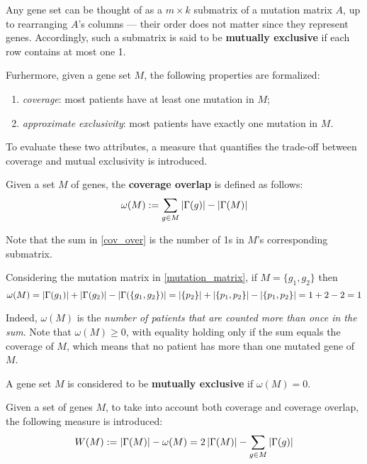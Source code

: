 Any gene set can be thought of as a $m \times k$ submatrix of a mutation matrix $A$, up to rearranging $A$'s columns --- their order does not matter since they represent genes. Accordingly, such a submatrix is said to be \textbf{mutually exclusive} if each row contains at most one 1.

Furhermore, given a gene set $M$, the following properties are formalized:

\begin{enumerate}[label=\roman*), font=\itshape]
    \item \textit{coverage}: most patients have at least one mutation in $M$;
    \item \textit{approximate exclusivity}: most patients have exactly one mutation in $M$.
\end{enumerate}

To evaluate these two attributes, a measure that quantifies the trade-off between coverage and mutual exclusivity is introduced.

\begin{definition} \label{cov_over}
    Given a set $M$ of genes, the \textbf{coverage overlap} is defined as follows: $$\omega(M) := \sum_{g \in M}{\left|\Gamma(g)\right|} - \left|\Gamma(M)\right|$$
\end{definition}

Note that the sum in \cref{cov_over} is the number of 1s in $M$'s corresponding submatrix.

\begin{example}
    Considering the mutation matrix in \cref{mutation_matrix}, if $M=\{g_1, g_2\}$ then $$\omega(M)=\left|\Gamma(g_1)\right| + \left|\Gamma(g_2)\right| - \left|\Gamma(\{g_1, g_2\})\right| = \left|\{p_2\}\right| + \left|\{p_1, p_2\}\right| - \left|\{p_1, p_2\}\right| = 1 + 2 - 2 = 1$$
\end{example}

Indeed, $\omega(M)$ is the \textit{number of patients that are counted more than once in the sum}. Note that $\omega(M) \ge 0$, with equality holding only if the sum equals the coverage of $M$, which means that no patient has more than one mutated gene of $M$.

\begin{definition}
    A gene set $M$ is considered to be \textbf{mutually exclusive} if $\omega(M) = 0$.
\end{definition}

\begin{definition} \label{weight}
    Given a set of genes $M$, to take into account both coverage and coverage overlap, the following measure is introduced: $$W(M): = \left|\Gamma(M)\right| - \omega(M) = 2 \left|\Gamma(M)\right| - \sum_{g \in M} {\left|\Gamma(g)\right|}$$
\end{definition}

